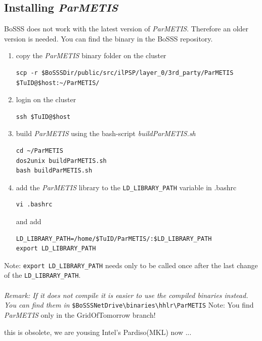 \subsection{Installing \emph{ParMETIS}}
\label{sec:parmetis}
BoSSS does not work with the latest version of \emph{ParMETIS}. Therefore an older version is needed. You can find the binary in the BoSSS repository.
\begin{enumerate}
\item copy the \emph{ParMETIS} binary folder on the cluster
\begin{verbatim}
scp -r $BoSSSDir/public/src/ilPSP/layer_0/3rd_party/ParMETIS $TuID@$host:~/ParMETIS/
\end{verbatim}
\item login on the cluster
\begin{verbatim}
ssh $TuID@$host
\end{verbatim}
\item build \emph{ParMETIS} using the bash-script \emph{buildParMETIS.sh}
\begin{verbatim}
cd ~/ParMETIS
dos2unix buildParMETIS.sh
bash buildParMETIS.sh
\end{verbatim}
\item  add the \emph{ParMETIS} library to the \verb|LD_LIBRARY_PATH| variable in .bashrc
\begin{verbatim}
vi .bashrc
\end{verbatim}
and add
\begin{verbatim}
LD_LIBRARY_PATH=/home/$TuID/ParMETIS/:$LD_LIBRARY_PATH
export LD_LIBRARY_PATH
\end{verbatim}
\end{enumerate}
Note: \verb|export LD_LIBRARY_PATH| needs only to be called once after the last change of the \verb|LD_LIBRARY_PATH|.\\\\
\textit{Remark: If it does not compile it is easier to use the compiled binaries instead. You can find them in} \verb|$BoSSSNetDrive\binaries\hhlr\ParMETIS|
Note: You find \emph{ParMETIS} only in the GridOfTomorrow branch!

 this is obsolete, we are yousing Intel's Pardiso(MKL) now ...
